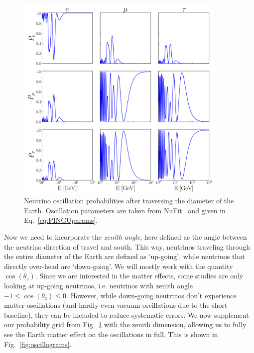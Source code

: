\begin{figure}
    \centering
    \includegraphics[width=0.9\textwidth]{figures/oscillations.pdf}
    \caption{Neutrino oscillation probabilities after traversing the diameter of the Earth. 
    Oscillation parameters are taken from NuFit~\cite{nufit} and given in Eq.~\ref{eq:PINGUparams}.}\label{fig:oscillations}
\end{figure}



Now we need to incorporate the \emph{zenith angle}, here defined as the angle between the neutrino direction of travel and south.
This way, neutrinos traveling through the entire diameter of the Earth are defined as `up-going', while
neutrinos that directly over-head are `down-going'. We will mostly work with the quantity $\cos{(\theta_z)}$.
Since we are interested in the matter effects, some studies are only looking at up-going neutrinos, i.e. neutrinos with
zenith angle $-1 \le \cos{(\theta_z)} \le 0$. However, while down-going neutrinos don't experience matter oscillations (and hardly even vacuum
oscillations due to the short baseline), they can be included to reduce systematic errors.
We now supplement our probability grid from Fig.~\ref{fig:oscillations} with the zenith dimension,
allowing us to fully see the Earth matter effect on the oscillations in full. This is shown in Fig.~\ref{fig:oscillograms}.


